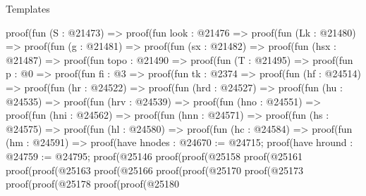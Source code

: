\begin{lexlean}{Templates}
\begin{coremodule}
                proof(fun (S : @21473) =>
                  proof(fun {look : @21476} =>
                    proof(fun (Lk : @21480) =>
                      proof(fun (g : @21481) =>
                        proof(fun (sx : @21482) =>
                          proof(fun (hsx : @21487) =>
                            proof(fun {topo : @21490} =>
                              proof(fun (T : @21495) =>
                                proof(fun {p : @0} =>
                                  proof(fun {fi : @3} =>
                                    proof(fun {tk : @2374} =>
                                      proof(fun (hf : @24514) =>
                                        proof(fun (hr : @24522) =>
                                          proof(fun (hrd : @24527) =>
                                            proof(fun (hu : @24535) =>
                                              proof(fun (hrv : @24539) =>
                                                proof(fun (hno : @24551) =>
                                                  proof(fun (hni : @24562) =>
                                                    proof(fun (hnn : @24571) =>
                                                      proof(fun (hs : @24575) =>
                                                        proof(fun (hl : @24580) =>
                                                          proof(fun (hc : @24584) =>
                                                            proof(fun (hm : @24591) =>
                                                              proof(have hnodes : @24670 := @24715;
                                                                proof(have hround : @24759 := @24795;
                                                                  proof(@25146
                                                                      proof(proof(@25158
                                                                            proof(@25161
                                                                                proof(proof(@25163
                                                                                      proof(@25166
                                                                                          proof(proof(@25170
                                                                                                proof(@25173
                                                                                                    proof(proof(@25178
                                                                                                          proof(proof(@25180

\end{coremodule}
\end{lexlean}
